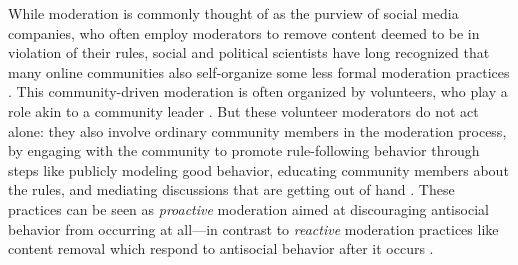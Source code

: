 \documentclass[12pt,letterpaper]{article}
\begin{document}
While moderation is commonly thought of as the purview of social media companies, who often employ moderators to remove content deemed to be in violation of their rules, social and political scientists have long recognized that many online communities also self-organize some less formal moderation practices \cite{grimmelmann_virtues_2015}.
This community-driven moderation is often organized by volunteers, who play a role akin to a community leader \cite{seering_reconsidering_2020}.
But these volunteer moderators do not act alone: they also involve ordinary community members in the moderation process, by engaging with the community to promote rule-following behavior through steps like publicly modeling good behavior, educating community members about the rules, and mediating discussions that are getting out of hand \cite{seering_shaping_2017,billings_understanding_2010}.
These practices can be seen as \emph{proactive} moderation aimed at discouraging antisocial behavior from occurring at all---in contrast to \emph{reactive} moderation practices like content removal which respond to antisocial behavior after it occurs \cite{lo_when_2018}.



\end{document}
